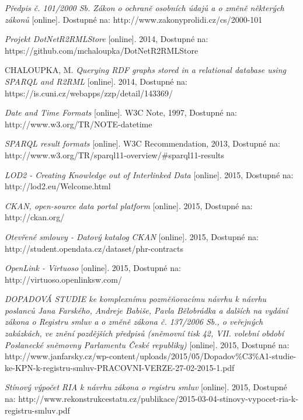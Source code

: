 \begin{thebibliography}{99}
  \emph{Předpis č. 101/2000 Sb. Zákon o ochraně osobních údajů a o změně některých zákonů} 
  [online]. Dostupné na: 
  http://www.zakonyprolidi.cz/cs/2000-101  
  
  \emph{Projekt DotNetR2RMLStore} 
  [online]. 2014, Dostupné na: 
  https://github.com/mchaloupka/DotNetR2RMLStore  
  
  CHALOUPKA, M.
  \emph{Querying RDF graphs stored in a relational database using SPARQL and R2RML} 
  [online]. 2014, Dostupné na: 
  https://is.cuni.cz/webapps/zzp/detail/143369/
  
  \emph{Date and Time Formats} 
  [online]. W3C Note, 1997, Dostupné na: 
  http://www.w3.org/TR/NOTE-datetime   
  
  \emph{SPARQL result formats} 
  [online]. W3C Recommendation, 2013, Dostupné na: 
  http://www.w3.org/TR/sparql11-overview/\#sparql11-results

  \emph{LOD2 - Creating Knowledge out of Interlinked Data} 
  [online]. 2015, Dostupné na: 
  http://lod2.eu/Welcome.html
  
  \emph{CKAN, open-source data portal platform} 
  [online]. 2015, Dostupné na: 
  http://ckan.org/
  
  \emph{Otevřené smlouvy - Datový katalog CKAN} 
  [online]. 2015, Dostupné na: 
  http://student.opendata.cz/dataset/phr-contracts   
  
  \emph{OpenLink - Virtuoso} 
  [online]. 2015, Dostupné na: 
  http://virtuoso.openlinksw.com/
 
  \emph{DOPADOVÁ STUDIE
ke komplexnímu pozměňovacímu návrhu k návrhu poslanců Jana Farského, Andreje
Babiše, Pavla Bělobrádka a dalších na vydání zákona o Registru smluv a o změně
zákona č. 137/2006 Sb., o veřejných zakázkách, ve znění pozdějších předpisů (sněmovní tisk 42, VII. volební období Poslanecké sněmovny Parlamentu České republiky)} 
  [online]. 2015, Dostupné na: 
  http://www.janfarsky.cz/wp-content/uploads/2015/05/Dopadov\%C3\%A1-studie-ke-KPN-k-registru-smluv-PRACOVNI-VERZE-27-02-2015-1.pdf
  
  \emph{Stínový výpočet RIA k návrhu zákona o registru smluv} 
  [online]. 2015, Dostupné na: 
  http://www.rekonstrukcestatu.cz/publikace/2015-03-04-stinovy-vypocet-ria-k-registru-smluv.pdf

\end{thebibliography}
